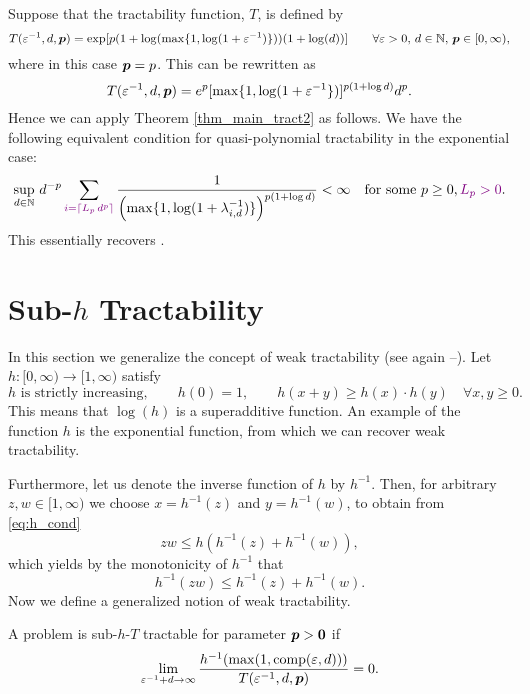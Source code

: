 \documentclass[sort&compress]{elsarticle}
\newcommand{\peter}[1]{\begingroup\color{violet}#1\endgroup}
\begin{document}
\begin{example}

\noindent Suppose that the tractability function, $T$, is defined by
\[
 T(\varepsilon^{-1},d,\boldsymbol{p})= \exp [p(1+\log(\max\{1,\log(1+\varepsilon^{-1})\}))(1+\log (d))]  \qquad \forall \varepsilon > 0, \,  d \in \mathbb{N}, \, \boldsymbol{p} \in [0,\infty),
\] where in this case $\boldsymbol{p} = p$. This can be rewritten as 
\[
T(\varepsilon^{-1},d,\boldsymbol{p}) = e^p[\max\{1,\log(1+\varepsilon^{-1}\})]^{p(1+\log d)}d^p.
\]
Hence we can apply Theorem \ref{thm_main_tract2} as follows. We have the following equivalent condition for quasi-polynomial tractability in the exponential case:
\[
\sup_{d\in\mathbb{N}}\,d^{-p}\sum_{\peter{i=\lceil L_p\,d^{p}\rceil}} \frac{1}{\left(\max\{1,\log(1+\lambda_{i,d}^{-1})\} \right)^{p(1+\log d)}}< \infty \quad \text{for some } p \geq 0, \peter{L_p >0}.
\]
\peter{This essentially recovers \cite[Theorem 2]{KriWoz19a}.
}
\end{example}






\section{Sub-$h$ Tractability}\label{sec:subh}
In this section we generalize the concept of weak tractability \peter{(see again \cite{NovWoz08a}--\cite{NovWoz12a})}.  Let  $h:[0,\infty) \to [1,\infty)$ satisfy
\begin{equation} \label{eq:h_cond}
	h \text{ is strictly increasing}, \qquad
	h(0)=1, \qquad
 h(x+y) \ge  h(x)\cdot h(y)  \quad \forall x,y \ge 0.
\end{equation}
This means that $\log(h)$ is a superadditive function.  An example of the function $h$ is the exponential function, from which we can recover weak tractability.

Furthermore, let us denote the inverse function of $h$ by $h^{-1}$.
Then, for arbitrary $z,w \in [1,\infty)$ we choose $x=h^{-1}(z)$ and $y=h^{-1}(w)$, to obtain \peter{from \eqref{eq:h_cond}}
\[
z w \le h (h^{-1}(z)+h^{-1}(w)),
\]
which yields by the monotonicity of $h^{-1}$ that
\begin{equation}\label{eq:submult_h_inverse}
h^{-1}(z w) \le h^{-1}(z)+h^{-1}(w).
\end{equation}
Now we define a generalized notion of weak tractability.
\begin{definition} \label{def:subhT}
	A problem is sub-$h$-$T$ tractable for parameter $\boldsymbol{p} > \boldsymbol{0}$ if
	\begin{equation*}
		\lim_{\varepsilon^{-1} + d \to \infty} \frac{h^{-1}(\max(1,\operatorname{comp}(\varepsilon,d)))}{T(\varepsilon^{-1},d,\boldsymbol{p})} = 0.
	\end{equation*}
\end{definition}
\end{document}
